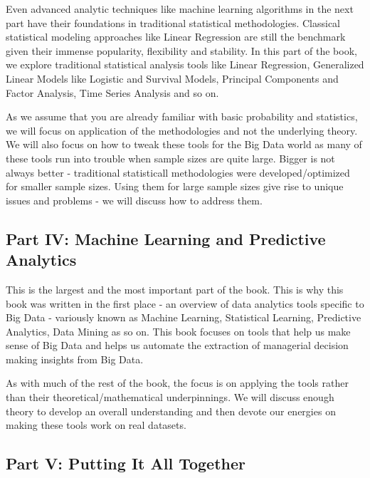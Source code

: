 \documentclass[]{krantz}
\theoremstyle{definition}
\theoremstyle{definition}
\theoremstyle{definition}
\theoremstyle{remark}
\begin{document}
Even advanced analytic techniques like machine learning algorithms in
the next part have their foundations in traditional statistical
methodologies. Classical statistical modeling approaches like Linear
Regression are still the benchmark given their immense popularity,
flexibility and stability. In this part of the book, we explore
traditional statistical analysis tools like Linear Regression,
Generalized Linear Models like Logistic and Survival Models, Principal
Components and Factor Analysis, Time Series Analysis and so on.

As we assume that you are already familiar with basic probability and
statistics, we will focus on application of the methodologies and not
the underlying theory. We will also focus on how to tweak these tools
for the Big Data world as many of these tools run into trouble when
sample sizes are quite large. Bigger is not always better - traditional
statisticall methodologies were developed/optimized for smaller sample
sizes. Using them for large sample sizes give rise to unique issues and
problems - we will discuss how to address them.

\subsection*{Part IV: Machine Learning and Predictive
Analytics}\label{part-iv-machine-learning-and-predictive-analytics}

This is the largest and the most important part of the book. This is why
this book was written in the first place - an overview of data analytics
tools specific to Big Data - variously known as Machine Learning,
Statistical Learning, Predictive Analytics, Data Mining as so on. This
book focuses on tools that help us make sense of Big Data and helps us
automate the extraction of managerial decision making insights from Big
Data.

As with much of the rest of the book, the focus is on applying the tools
rather than their theoretical/mathematical underpinnings. We will
discuss enough theory to develop an overall understanding and then
devote our energies on making these tools work on real datasets.

\subsection*{Part V: Putting It All
Together}\label{part-v-putting-it-all-together}
\end{document}
